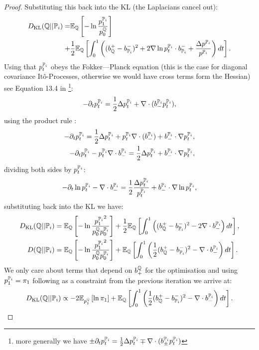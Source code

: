 \documentclass[a4paper,12pt,twoside,openright]{report}
\theoremstyle{definition}
\begin{document}
\begin{proof}
Substituting this back into the KL (the Laplacians cancel out):
\begin{align*}
\KL(\Q||{\P_{i}}) = &\E_\Q\left[-\log \frac{ p^{\P_{i}}_1}{ p^\Q_0}\right] \\+ &\frac{1}{2}\E_{\Q}\left[\int_0^1 \left(( b_\Q^{+} - b_{\P_{i}}^{-})^2 + 2\nabla\log p_t^{\P_{i}} \cdot b_{\P_{i}}^{-}+ \frac{\Delta  p^{\P_{i}}}{ p^{\P_{i}}}\right)dt\right].
\end{align*}
Using that $ p_t^{\P_{i}}$ obeys the Fokker—Planck equation (this is the case for diagonal covariance Itô-Processes, otherwise we would have cross terms form the Hessian) see Equation 13.4 in \cite{nelson1967dynamical}\footnote{more generally we have $\pm\partial_t p_t^{\P_{i}} = \frac{1}{2}\Delta p_t^{\P_{i}}\mp\nabla\cdot(b_\pm^{\P_{i}} p_t^{\P_{i}})$}: 
\begin{align*}
-\partial_t p_t^{\P_{i}} = \frac{1}{2}\Delta p_t^{\P_{i}}+\nabla\cdot(b_{-}^{\P_{i}} p_t^{\P_{i}}),
\end{align*}
using the product rule : 
\begin{align*}
-\partial_t p_t^{\P_{i}} = \frac{1}{2}\Delta p_t^{\P_{i}}+  p_t^{\P_{i}} \nabla\cdot(b_{-}^{\P_{i}}) + b_{-}^{\P_{i}} \cdot \nabla p_t^{\P_{i}}, \\
-\partial_t p_t^{\P_{i}} -  p_t^{\P_{i}} \nabla\cdot b_{-}^{\P_{i}}  = \frac{1}{2}\Delta p_t^{\P_{i}}+ b_{-}^{\P_{i}} \cdot\nabla  p_t^{\P_{i}},
\end{align*}
dividing both sides by $ p_t^{\P_{i}}$:
\begin{align*}
-\partial_t \log  p_t^{\P_{i}} - \nabla\cdot b_{-}^{\P_{i}}  = \frac{1}{2}\frac{\Delta  p_t^{\P_{i}}}{ p_t^{\P_{i}}}+  b_{-}^{\P_{i}} \cdot \nabla \log  p_t^{\P_{i}},
\end{align*}
substituting back into the KL we have:
\begin{align*}
\KL(\Q||{\P_{i}}) &= \E_\Q\left[-\log \frac{{ p^{\P_{i}}_1}^2}{ p^\Q_0  p_0^{{\P_{i}}}}\right] + \frac{1}{2}\E_{\Q}\left[\int_0^1 \left(( b_\Q^{+} - b_{\P_{i}}^{-})^2 - 2\nabla\cdot b_{-}^{\P_{i}} \right)dt\right], \\
D(\Q||{\P_{i}}) &= \E_\Q\left[-\log \frac{{ p^{\P_{i}}_1}^2}{ p^\Q_0   p_0^{{\P_{i}}}}\right] + \E_{\Q}\left[\int_0^1 \left(\frac{1}{2}( b_\Q^{+} - b_{\P_{i}}^{-})^2 - \nabla\cdot b_{-}^{\P_{i}} \right)dt\right].
\end{align*}
We only care about terms that depend on $b_{+}^\Q$ for the optimisation and using $p^{\P_{i}}_1=\pi_1$ following as a constraint from the previous iteration we arrive at:
\begin{align}
\KL(\Q||{\P_{i}}) \propto -2\E_{ p^\Q_1}\left[\log {{ \pi_1 }} \right] + \E_{\Q}\left[\int_0^1 \left(\frac{1}{2}( b_\Q^{+} - b_{\P_{i}}^{-})^2 - \nabla\cdot b_{-}^{\P_{i}} \right)dt\right].
\end{align}
\end{proof}
\end{document}
